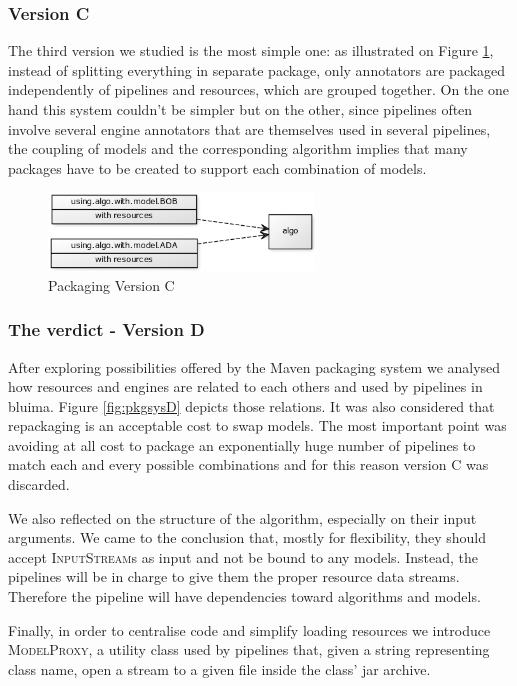 \documentclass{article}
\newcommand{\id}[1]{\mbox{\textsc{#1}}}
\begin{document}
\subsubsection{Version C}

The third version we studied is the most simple one: as illustrated on Figure \ref{fig:pkgsysC}, instead of splitting everything in separate package, only annotators are packaged independently of pipelines and resources, which are grouped together. On the one hand this system couldn't be simpler but on the other, since pipelines often involve several engine annotators that are themselves used in several pipelines, the coupling of models and the corresponding algorithm implies that many packages have to be created to support each combination of models.


\begin{figure}
\centering
\includegraphics[width=200pt]{res/packaging_version_C.png}
\caption{Packaging Version C}
\label{fig:pkgsysC}
\end{figure}

\subsubsection{The verdict - Version D}

After exploring possibilities offered by the Maven packaging system we analysed how resources and engines are related to each others and used by pipelines in bluima. Figure \ref{fig:pkgsysD} depicts those relations. It was also considered that repackaging is an acceptable cost to swap models. The most important point was avoiding at all cost to package an exponentially huge number of pipelines to match each and every possible combinations and for this reason version C was discarded.

We also reflected on the structure of the algorithm, especially on their input arguments. We came to the conclusion that, mostly for flexibility, they should accept \id{InputStream}s as input and not be bound to any models. Instead, the pipelines will be in charge to give them the proper resource data streams. Therefore the pipeline will have dependencies toward algorithms and models.

Finally, in order to centralise code and simplify loading resources we introduce \id{ModelProxy}, a utility class used by pipelines that, given a string representing class name, open a stream to a given file inside the class' jar archive.
\end{document}
